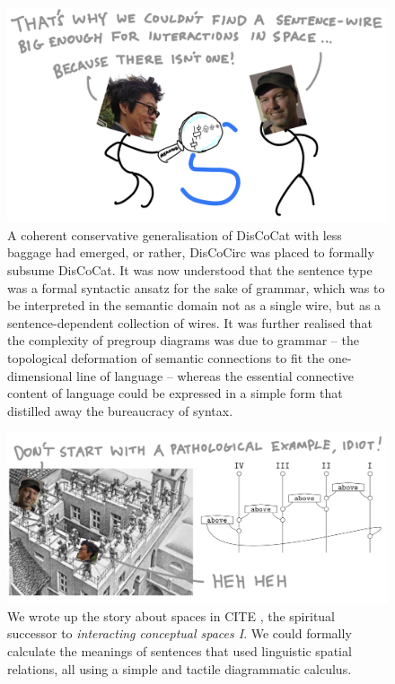 \begin{figure}[h!]
\includegraphics{figures/cartoons/nosent}
\caption{A coherent conservative generalisation of DisCoCat with less baggage had emerged, or rather, DisCoCirc was placed to formally subsume DisCoCat. It was now understood that the sentence type was a formal syntactic ansatz for the sake of grammar, which was to be interpreted in the semantic domain not as a single wire, but as a sentence-dependent collection of wires. It was further realised that the complexity of pregroup diagrams was due to grammar -- the topological deformation of semantic connections to fit the one-dimensional line of language -- whereas the essential connective content of language could be expressed in a simple form that distilled away the bureaucracy of syntax.}
\end{figure}

\begin{figure}[h!]
\includegraphics{figures/cartoons/space1}
\caption{We wrote up the story about spaces in \bR CITE \e, the spiritual successor to \emph{interacting conceptual spaces I}. We could formally calculate the meanings of sentences that used linguistic spatial relations, all using a simple and tactile diagrammatic calculus.}
\end{figure}

